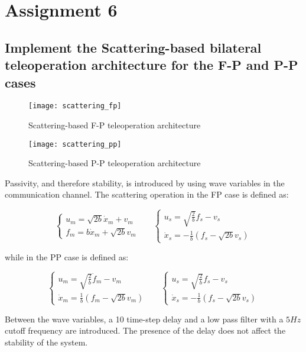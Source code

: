 \section{Assignment 6}

\subsection{Implement the Scattering-based bilateral teleoperation architecture for the F-P and P-P cases}

\begin{figure}[h]
\centering
\texttt{[image: scattering\_fp]}
\caption{Scattering-based F-P teleoperation architecture}
\end{figure}

\begin{figure}[h]
\centering
\texttt{[image: scattering\_pp]}
\caption{Scattering-based P-P teleoperation architecture}
\end{figure}

Passivity, and therefore stability, is introduced by using wave variables in the communication channel. The scattering operation in the FP case is defined as:

\begin{equation*}
\begin{cases}
u_m=\sqrt{2b}\dot x_m+v_m\\
f_m=b\dot x_m + \sqrt{2b}v_m
\end{cases}\;\;\;\;\;\;\begin{cases}
u_s = \sqrt{\frac{2}{b}}f_s-v_s\\
\dot x_s= -\frac{1}{b}(f_s-\sqrt{2b}v_s)
\end{cases}
\end{equation*}

while in the PP case is defined as:

\begin{equation*}
\begin{cases}
u_m=\sqrt{\frac{2}{b}}\dot f_m-v_m\\
\dot x_m=\frac{1}{b} (f_m - \sqrt{2b}v_m)
\end{cases}\;\;\;\;\;\;\begin{cases}
u_s = \sqrt{\frac{2}{b}}f_s-v_s\\
\dot x_s= -\frac{1}{b}(f_s-\sqrt{2b}v_s)
\end{cases}
\end{equation*}

Between the wave variables, a 10 time-step delay and a low pass filter with a $5Hz$ cutoff frequency are introduced. The presence of the delay does not affect the stability of the system.

